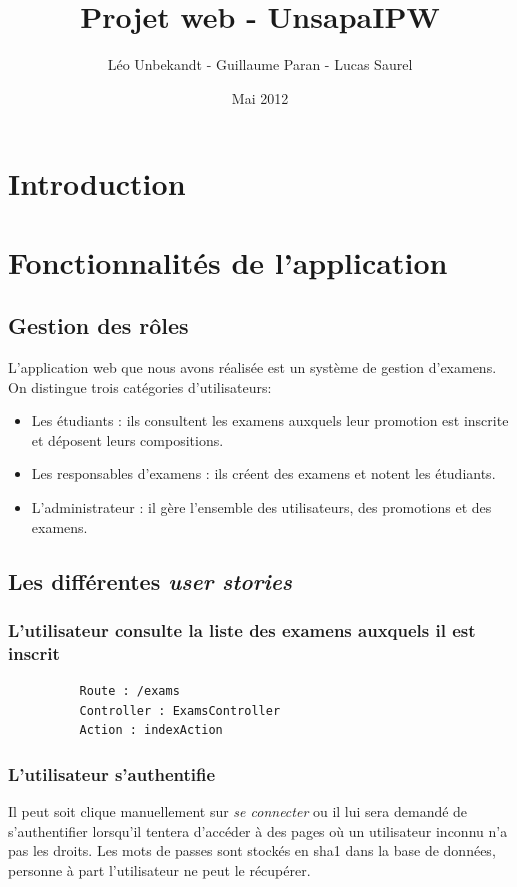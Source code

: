 \documentclass{report}
\author{Léo Unbekandt - Guillaume Paran - Lucas Saurel}
\date{Mai 2012}
\title{Projet web - UnsapaIPW}
\begin{document}
  \maketitle
  \clearpage
  \tableofcontents
  \clearpage

  \section*{Introduction}

  \section{Fonctionnalités de l'application}
    \subsection{Gestion des rôles}
      L'application web que nous avons réalisée est un système de gestion 
      d'examens. On distingue trois catégories d'utilisateurs:

      \begin{itemize}
        \item{Les étudiants : ils consultent les examens auxquels leur promotion 
          est inscrite et déposent leurs compositions.}
        \item{Les responsables d'examens : ils créent des examens et notent les 
          étudiants.}
        \item{L'administrateur : il gère l'ensemble des utilisateurs, des 
          promotions et des examens.}
      \end{itemize}

    \subsection{Les différentes \textsl{user stories}}
      \subsubsection{L'utilisateur consulte la liste des examens auxquels il est inscrit}
        \begin{verbatim}
          Route : /exams 
          Controller : ExamsController
          Action : indexAction
        \end{verbatim}
      \subsubsection{L'utilisateur s'authentifie}
        Il peut soit clique manuellement sur \textsl{se connecter} ou il lui sera demandé
        de s'authentifier lorsqu'il tentera d'accéder à des pages où un utilisateur inconnu
        n'a pas les droits. Les mots de passes sont stockés en sha1 dans la base de données,
        personne à part l'utilisateur ne peut le récupérer.
\end{document}
